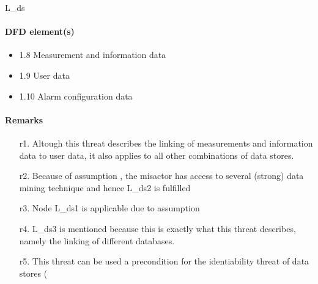 L\_ds

\paragraph{DFD element(s)}

\begin{itemize}
  \item 1.8 Measurement and information data
  \item 1.9 User data
  \item 1.10 Alarm configuration data
\end{itemize}

\paragraph{Remarks}
	\begin{enumerate}
         \item[r1.] Altough this threat describes the linking of measurements
         and information data to user data, it also applies to all other
         combinations of data stores.
         \item[r2.] Because of assumption %
		 , the misactor has access to several (strong) data mining technique and hence
		 L\_ds2 is fulfilled
         \item[r3.] Node L\_ds1 is applicable due to assumption %
         \item[r4.] L\_ds3 is mentioned because this is exactly what this threat
         describes, namely the linking of different databases.
         \item[r5.] This threat can be used a precondition for the identiability
         threat of data stores (%
    \end{enumerate}
